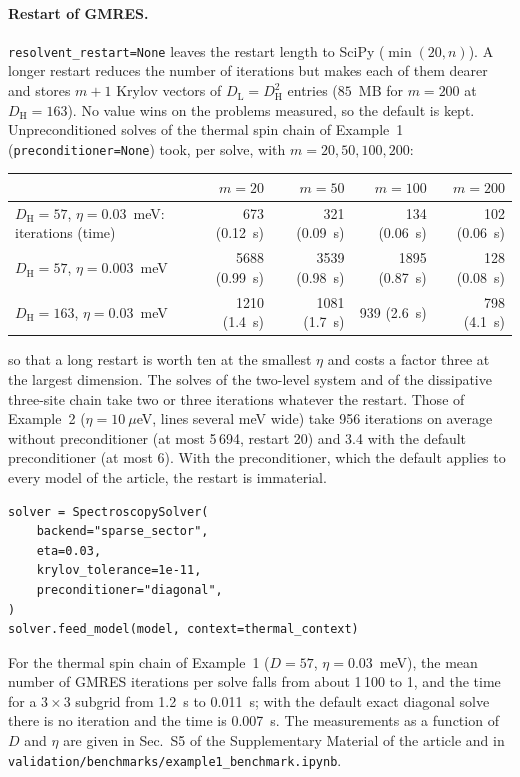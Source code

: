 \documentclass[11pt]{article}
\newcommand{\ArtSISecScaling}{S5}      %
\begin{document}
\paragraph{Restart of GMRES.}
\texttt{resolvent\_restart=None} leaves the restart length to SciPy ($\min(20,n)$). A longer restart reduces the number of iterations but makes each of them dearer and stores $m+1$ Krylov vectors of $D_{\mathrm L}=D_{\mathrm H}^2$ entries ($85$~MB for $m=200$ at $D_{\mathrm H}=163$). No value wins on the problems measured, so the default is kept. Unpreconditioned solves of the thermal spin chain of Example~1 (\texttt{preconditioner=None}) took, per solve, with $m=20, 50, 100, 200$:
\begin{center}
\footnotesize
\begin{tabular}{lrrrr}
\toprule
 & $m=20$ & $m=50$ & $m=100$ & $m=200$\\
\midrule
$D_{\mathrm H}=57$, $\eta=0.03$~meV: iterations (time) & 673 (0.12~s) & 321 (0.09~s) & 134 (0.06~s) & 102 (0.06~s)\\
$D_{\mathrm H}=57$, $\eta=0.003$~meV & 5688 (0.99~s) & 3539 (0.98~s) & 1895 (0.87~s) & 128 (0.08~s)\\
$D_{\mathrm H}=163$, $\eta=0.03$~meV & 1210 (1.4~s) & 1081 (1.7~s) & 939 (2.6~s) & 798 (4.1~s)\\
\bottomrule
\end{tabular}
\end{center}
so that a long restart is worth ten at the smallest $\eta$ and costs a factor three at the largest dimension. The solves of the two-level system and of the dissipative three-site chain take two or three iterations whatever the restart. Those of Example~2 ($\eta=10~\mu$eV, lines several meV wide) take 956 iterations on average without preconditioner (at most 5\,694, restart 20) and 3.4 with the default preconditioner (at most 6). With the preconditioner, which the default applies to every model of the article, the restart is immaterial.

\begin{verbatim}
solver = SpectroscopySolver(
    backend="sparse_sector",
    eta=0.03,
    krylov_tolerance=1e-11,
    preconditioner="diagonal",
)
solver.feed_model(model, context=thermal_context)
\end{verbatim}

For the thermal spin chain of Example~1 (\(D=57\), \(\eta=0.03\)~meV), the mean
number of GMRES iterations per solve falls from about 1\,100 to 1, and the time
for a \(3\times3\) subgrid from 1.2~s to 0.011~s; with the default exact diagonal solve there
is no iteration and the time is 0.007~s. The measurements as a function of
\(D\) and \(\eta\) are given in Sec.~\ArtSISecScaling{} of the Supplementary Material of the article and in
\texttt{validation/benchmarks/example1\_benchmark.ipynb}.
\end{document}

